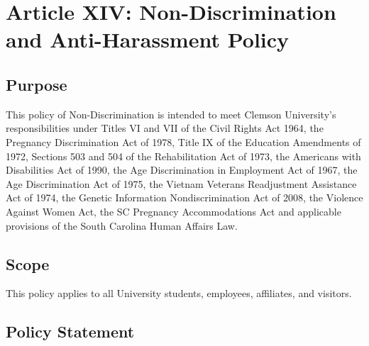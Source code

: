 \section*{Article XIV: Non-Discrimination and Anti-Harassment Policy}

\subsection*{Purpose}

This policy of Non-Discrimination is intended to meet Clemson University’s responsibilities under Titles VI and VII of the Civil Rights Act 1964, the Pregnancy Discrimination Act of 1978, Title IX of the Education Amendments of 1972, Sections 503 and 504 of the Rehabilitation Act of 1973, the Americans with Disabilities Act of 1990, the Age Discrimination in Employment Act of 1967, the Age Discrimination Act of 1975, the Vietnam Veterans Readjustment Assistance Act of 1974, the Genetic Information Nondiscrimination Act of 2008, the Violence Against Women Act, the SC Pregnancy Accommodations Act and applicable provisions of the South Carolina Human Affairs Law.

\subsection*{Scope}

This policy applies to all University students, employees, affiliates, and visitors.

\subsection*{Policy Statement}

